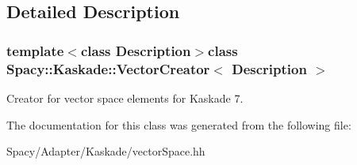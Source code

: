 \subsection{Detailed Description}
\subsubsection*{template$<$class Description$>$class Spacy\+::\+Kaskade\+::\+Vector\+Creator$<$ Description $>$}

Creator for vector space elements for Kaskade 7. 

The documentation for this class was generated from the following file\+:\begin{DoxyCompactItemize}
\item 
Spacy/\+Adapter/\+Kaskade/vector\+Space.\+hh\end{DoxyCompactItemize}
